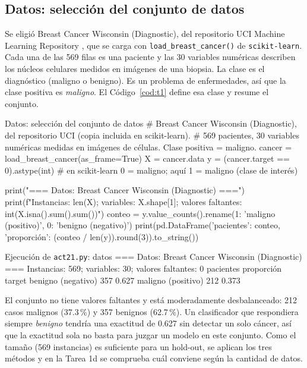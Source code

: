 \documentclass[11pt,letterpaper]{article}
\begin{document}
\subsection{Datos: selección del conjunto de datos}

Se eligió Breast Cancer Wisconsin (Diagnostic), del repositorio UCI Machine Learning Repository \parencite{wolberg1993}, que se carga con \texttt{load\_breast\_cancer()} de \texttt{scikit-learn}. Cada una de las 569 filas es una paciente y las 30 variables numéricas describen los núcleos celulares medidos en imágenes de una biopsia. La clase es el diagnóstico (maligno o benigno). Es un problema de enfermedades, así que la clase positiva es \textit{maligno}. El Código~\ref{cod:t1} define esa clase y resume el conjunto.

\begin{codigo}[label=cod:t1]{Datos: selección del conjunto de datos}
# Breast Cancer Wisconsin (Diagnostic), del repositorio UCI (copia incluida en scikit-learn).
# 569 pacientes, 30 variables numéricas medidas en imágenes de células. Clase positiva = maligno.
cancer = load_breast_cancer(as_frame=True)
X = cancer.data
y = (cancer.target == 0).astype(int)  # en scikit-learn 0 = maligno; aquí 1 = maligno (clase de interés)

print("=== Datos: Breast Cancer Wisconsin (Diagnostic) ===")
print(f"Instancias: {len(X)}; variables: {X.shape[1]}; valores faltantes: {int(X.isna().sum().sum())}")
conteo = y.value_counts().rename({1: 'maligno (positivo)', 0: 'benigno (negativo)'})
print(pd.DataFrame({'pacientes': conteo, 'proporción': (conteo / len(y)).round(3)}).to_string())
\end{codigo}

\begin{consola}[label=out:t1]{Ejecución de \texttt{act21.py}: datos}
=== Datos: Breast Cancer Wisconsin (Diagnostic) ===
Instancias: 569; variables: 30; valores faltantes: 0
                    pacientes  proporción
target                                   
benigno (negativo)        357       0.627
maligno (positivo)        212       0.373
\end{consola}

El conjunto no tiene valores faltantes y está moderadamente desbalanceado: 212 casos malignos (37.3\,\%) y 357 benignos (62.7\,\%). Un clasificador que respondiera siempre \textit{benigno} tendría una exactitud de 0.627 sin detectar un solo cáncer, así que la exactitud sola no basta para juzgar un modelo en este conjunto. Como el tamaño (569 instancias) es suficiente para un hold-out, se aplican los tres métodos y en la Tarea 1d se comprueba cuál conviene según la cantidad de datos.
\end{document}

